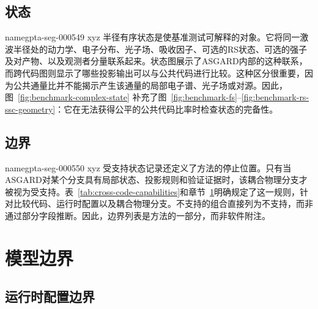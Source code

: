 \documentclass[twocolumn]{aastex702}
\makeatletter
\providecommand{\gptareaderanchor}[1]{\pdfdest name{#1} xyz}%
\providecommand{\gptareaderanchor}[1]{\special{pdf:dest (#1) [ @thispage /XYZ @xpos @ypos null ]}}%
\makeatother
\begin{document}
\subsection{状态}


\gptareaderanchor{gpta-seg-000549}%
半径有序状态是使基准测试可解释的对象。它将同一激波半径处的动力学、电子分布、光子场、吸收因子、可选的RS状态、可选的强子及对产物、以及观测者分量联系起来。状态图展示了ASGARD内部的这种联系，而跨代码图则显示了哪些投影输出可以与公共代码进行比较。这种区分很重要，因为公共通量比并不能揭示产生该通量的局部电子谱、光子场或对源。因此，图~\ref{fig:benchmark-complex-state} 补充了图~\ref{fig:benchmark-fs}--\ref{fig:benchmark-rs-ssc-geometry}：它在无法获得公平的公共代码比率时检查状态的完备性。

\subsection{边界}


\gptareaderanchor{gpta-seg-000550}%
受支持状态记录还定义了方法的停止位置。只有当ASGARD对某个分支具有局部状态、投影规则和验证证据时，该耦合物理分支才被视为受支持。表~\ref{tab:cross-code-capabilities}和章节~\ref{sec:limits}明确规定了这一规则，针对比较代码、运行时配置以及耦合物理分支。不支持的组合直接列为不支持，而非通过部分字段推断。因此，边界列表是方法的一部分，而非软件附注。

\section{模型边界} \label{sec:limits}

\subsection{运行时配置边界}
\end{document}
